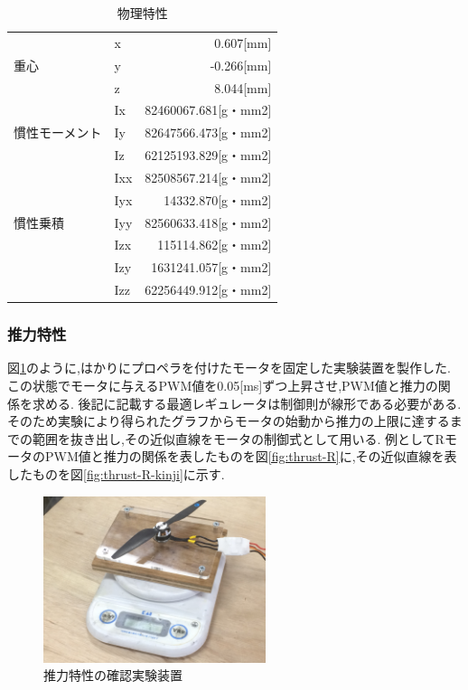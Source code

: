 \documentclass[12pt,oneside]{sotsuken_paper}
\begin{document}
\begin{table}[htbp]
	\begin{center}
		\caption{物理特性}
		\begin{tabular}{|l|l|r|} \hline
			 & x & 0.607[mm] \\
			重心 & y & -0.266[mm] \\
			 & z & 8.044[mm]　\\ \hline
			　& Ix & 82460067.681[g・mm2] \\
			慣性モーメント & Iy & 82647566.473[g・mm2] \\
			 & Iz & 62125193.829[g・mm2] \\ \hline
			 & Ixx & 82508567.214[g・mm2] \\
			 & Iyx & 14332.870[g・mm2] \\
			慣性乗積 & Iyy & 82560633.418[g・mm2] \\
			 & Izx & 115114.862[g・mm2] \\
			 & Izy & 1631241.057[g・mm2] \\
			 & Izz & 62256449.912[g・mm2] \\ \hline
		\end{tabular}
		\label{table:phy}
	\end{center}
\end{table}

\subsubsection{推力特性}
図\ref{fig:thrust-test}のように,はかりにプロペラを付けたモータを固定した実験装置を製作した.
この状態でモータに与えるPWM値を0.05[ms]ずつ上昇させ,PWM値と推力の関係を求める.
後記に記載する最適レギュレータは制御則が線形である必要がある.
そのため実験により得られたグラフからモータの始動から推力の上限に達するまでの範囲を抜き出し,その近似直線をモータの制御式として用いる.
例としてRモータのPWM値と推力の関係を表したものを図\ref{fig:thrust-R}に,その近似直線を表したものを図\ref{fig:thrust-R-kinji}に示す.

\begin{figure}[htbp]
	\begin{center}
		\includegraphics[width=65mm]{image/thrust/thrust-test.jpg}
		\caption{推力特性の確認実験装置}
		\label{fig:thrust-test}
	\end{center}
\end{figure}
\end{document}
